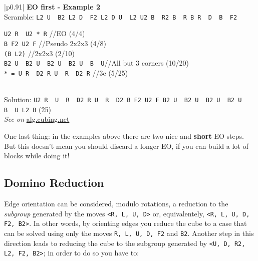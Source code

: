 \documentclass[11pt,a4paper]{book}
\newcommand{\p}{\textquotesingle}
\newcommand{\m}{\texttt}
\newcommand{\ps}{\p\,\,}
\newcommand{\comment}[1]{{\color{gray}\quad//#1}}
\begin{document}
\bigskip
\begin{tabular}{|p{}|}
\hline
\textbf{EO first - Example 2}\\
\hline
Scramble: \m{L2 U\ps B2 L2 D\ps F2 L2 D U\ps L2 U2 B\ps R2 B\ps R B R\ps D\ps B\ps F2}\\
\hline
\begin{minipage}[l]{0.650\textwidth}
\m{U2 R\ps U2 * R\p} \comment{EO (4/4)}\\
\m{B F2 U2 F} \comment{Pseudo 2x2x3 (4/8)}\\
\m{(B L2)} \comment{2x2x3 (2/10)}\\
\m{B2 U\ps B2 U\ps B2 U\ps B2 U\ps B\ps U}\comment{All but 3 corners (10/20)}\\
\m{* = U R\ps D2 R U\ps R\ps D2 R} \comment{3c (5/25)}
\end{minipage}
\begin{minipage}[c]{0.25\textwidth}

\end{minipage}\\
\hline
Solution: \m{U2 R\ps U\ps R\ps D2 R U\ps R\ps D2 B F2 U2 F B2 U\ps B2 U\ps B2 U\ps B2 U\ps B\ps U L2 B\p} (25)\\
\hline
\emph{See on }\href{https://alg.cubing.net/?setup=L2_B-_L2_U-_B2_L2_D-_F2_L2_D_U-_L2_U2_B-_R2_B-_R_B_R-_D-_B-_F2&alg=\%2F\%2FPremoves_(NISS)_added_to_the_scramble\%0AU2_R-_U2_(U_R-_D2_R_U-_R-_D2_R)_R-_\%2F\%2FEO\%0AB_F2_U2_F_\%2F\%2F2x2x3\%0AB2_U-_B2_U-_B2_U-_B2_U-_B-_U_\%2F\%2FAll_but_3_corners}{alg.cubing.net}\\
\hline
\end{tabular}
\bigskip


One last thing: in the examples above there are two nice and \textbf{short} EO steps. But this doesn't mean you should discard a longer EO, if you can build a lot of blocks while doing it!


\subsection{Domino Reduction}
\label{subsection:eoToDR}

Edge orientation can be considered, modulo rotations, a reduction to the \emph{subgroup} generated by the moves \m{<R, L, U, D>} or, equivalentely, \m{<R, L, U, D, F2, B2>}. In other words, by orienting edges you reduce the cube to a case that can be solved using only the moves \m{R, L, U, D, F2} and \m{B2}. Another step in this direction leads to reducing the cube to the subgroup generated by \m{<U, D, R2, L2, F2, B2>}; in order to do so you have to:
\end{document}
